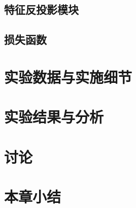 \subsection{特征反投影模块}

\subsection{损失函数}

\section{实验数据与实施细节}

\section{实验结果与分析}

\section{讨论}

\section{本章小结}

